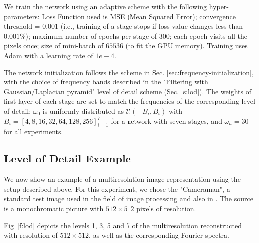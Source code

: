 We train the network using an adaptive scheme with the following hyper-parameters: Loss Function used is MSE (Mean Squared Error); convergence threshold = $0.001$ (i.e., training of a stage stops if loss value changes less than $0.001\%$); maximum number of epochs per stage of $300$; each epoch visits all the pixels once; size of mini-batch of $65536$ (to fit the GPU memory). Training uses Adam with a learning rate of $1e-4$.

The network initialization follows the scheme in Sec. \ref{sec:frequency-initialization}, with the choice of frequency bands described in the "Filtering with Gaussian/Laplacian pyramid" level of detail scheme (Sec. \ref{s:lod}). The weights of first layer of each stage are set to match the frequencies of the corresponding level of detail: $\omega_0$ is uniformly distributed as $ \mathcal{U}(-B_i, B_i)$ with $B_i = [4, 8, 16, 32, 64, 128, 256]_{i=1}^7$ for a network with seven stages, and $\omega_h = 30$ for all experiments.


\subsection{Level of Detail Example}
\label{ss:LOD}

We now show an example of a multiresolution image representation using the setup described above. For this experiment, we chose the "Cameraman", a standard test image used in the field of image processing and also in \citet{sitzmann2019siren}.
The source is a monochromatic picture with $512\times 512$ pixels of resolution.

Fig~\ref{f:lod} depicts the levels 1, 3, 5 and 7 of the multiresolution reconstructed with resolution of $512\times 512$, as well as the corresponding Fourier spectra. 

